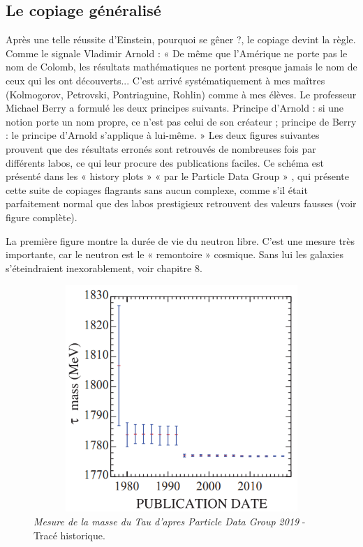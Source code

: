 \documentclass[a4paper,12pt]{article}
\begin{document}
\subsection {Le copiage généralisé}

Après une telle réussite d’Einstein, pourquoi se gêner ?, le copiage devint la règle. Comme le signale Vladimir Arnold : « De même que l’Amérique ne porte pas le nom de Colomb, les résultats mathématiques ne portent presque jamais le nom de ceux qui les ont découverts... C’est arrivé systématiquement à mes maîtres (Kolmogorov, Petrovski, Pontriaguine, Rohlin) comme à mes élèves. Le professeur Michael Berry a formulé les deux principes suivants. Principe d’Arnold : si une notion porte un nom propre, ce n’est pas celui de son créateur ; principe de Berry : le principe d’Arnold s'applique à lui-même. » 
Les deux figures suivantes prouvent que des résultats erronés sont retrouvés de nombreuses fois par différents labos, ce qui leur procure des publications faciles. Ce schéma est présenté dans les « history plots » « par le Particle Data Group » \cite{Tanabashi}, qui présente cette suite de copiages flagrants sans aucun complexe, comme s’il était parfaitement normal que des labos prestigieux retrouvent des valeurs fausses (voir figure complète). 

La première figure montre la durée de vie du neutron libre. C’est une mesure très importante, car le neutron est le « remontoire » cosmique. Sans lui les galaxies s’éteindraient inexorablement, voir chapitre 8.


\begin{figure}
\centering
\includegraphics[width=13.5cm,height=8.6cm]{./figures/tau-mass-pdg.png}
\caption [Mesures de la masse du Tau depuis 1978]{\textit{Mesure de la masse du Tau d'apres Particle Data Group 2019} - Tracé historique.} 
\label{fig:7:figure7}
\end{figure}
\end{document}
